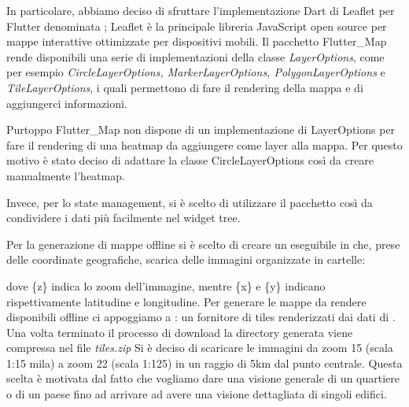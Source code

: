 \documentclass[a4paper]{report}
\begin{document}
In particolare, abbiamo deciso di sfruttare l'implementazione Dart di Leaflet per Flutter denominata \cite{FlutterMap}; Leaflet è la principale libreria JavaScript open source per mappe interattive ottimizzate per dispositivi mobili. Il pacchetto Flutter\_Map rende disponibili una serie di implementazioni della classe \textit{LayerOptions}, come per esempio \textit{CircleLayerOptions, MarkerLayerOptions, PolygonLayerOptions} e \textit{TileLayerOptions}, i quali permettono di fare il rendering della mappa e di aggiungerci informazioni. 

Purtoppo Flutter\_Map non dispone di un implementazione di LayerOptions per fare il rendering di una heatmap da aggiungere come layer alla mappa. Per questo motivo è stato deciso di adattare la classe CircleLayerOptions così da creare manualmente l'heatmap.

Invece, per lo state management, si è scelto di utilizzare il pacchetto \cite{Provider} così da condividere i dati più facilmente nel widget tree. 
 
Per la generazione di mappe offline si è scelto di creare un eseguibile in \cite{Rust} che, prese delle coordinate geografiche, scarica delle immagini organizzate in cartelle:
\begin{center}
    {\setnewpathsep{/} }
\end{center}
dove \{z\} indica lo zoom dell'immagine, mentre \{x\} e \{y\} indicano rispettivamente latitudine e longitudine.
Per generare le mappe da rendere disponibili offline ci appoggiamo a \cite{Thunderforest}: un fornitore di tiles renderizzati dai dati di \cite{OpenStreetMap}.
Una volta terminato il processo di download la directory generata viene compressa nel file \textit{tiles.zip}
Si è deciso di scaricare le immagini da zoom 15 (scala 1:15 mila) a zoom 22 (scala 1:125) in un raggio di 5km dal punto centrale. Questa scelta è motivata dal fatto che vogliamo dare una visione generale di un quartiere o di un paese fino ad arrivare ad avere una visione dettagliata di singoli edifici.


\end{document}
